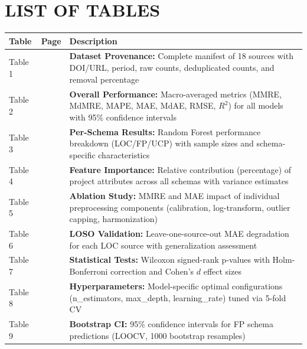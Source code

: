 \documentclass[11pt,a4paper]{article}
\begin{document}
\newpage

\section*{LIST OF TABLES}

\vspace{0.3cm}

\noindent
\begin{tabular}{|p{}|p{}|p{}|}
\hline
\rowcolor{gray!30}
\textbf{Table} & \textbf{Page} & \textbf{Description} \\
\hline
Table 1 & \pageref{tab:dataset-summary} & \textbf{Dataset Provenance:} Complete manifest of 18 sources with DOI/URL, period, raw counts, deduplicated counts, and removal percentage \\
\hline
Table 2 & \pageref{tab:overall-performance} & \textbf{Overall Performance:} Macro-averaged metrics (MMRE, MdMRE, MAPE, MAE, MdAE, RMSE, $R^2$) for all models with 95\% confidence intervals \\
\hline
Table 3 & \pageref{tab:per-schema} & \textbf{Per-Schema Results:} Random Forest performance breakdown (LOC/FP/UCP) with sample sizes and schema-specific characteristics \\
\hline
Table 4 & \pageref{tab:feature-importance} & \textbf{Feature Importance:} Relative contribution (percentage) of project attributes across all schemas with variance estimates \\
\hline
Table 5 & \pageref{tab:ablation} & \textbf{Ablation Study:} MMRE and MAE impact of individual preprocessing components (calibration, log-transform, outlier capping, harmonization) \\
\hline
Table 6 & \pageref{tab:loso} & \textbf{LOSO Validation:} Leave-one-source-out MAE degradation for each LOC source with generalization assessment \\
\hline
Table 7 & \pageref{tab:statistical-tests} & \textbf{Statistical Tests:} Wilcoxon signed-rank p-values with Holm-Bonferroni correction and Cohen's $d$ effect sizes \\
\hline
Table 8 & \pageref{tab:hyperparameters} & \textbf{Hyperparameters:} Model-specific optimal configurations (n\_estimators, max\_depth, learning\_rate) tuned via 5-fold CV \\
\hline
Table 9 & \pageref{tab:bootstrap-ci} & \textbf{Bootstrap CI:} 95\% confidence intervals for FP schema predictions (LOOCV, 1000 bootstrap resamples) \\

\end{tabular}
\end{document}
